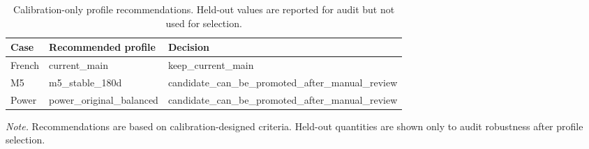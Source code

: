 \begin{table}[t]
\centering
\small
\caption{Calibration-only profile recommendations. Held-out values are reported for audit but not used for selection.}
\label{tab:profile_recommendations}
\begin{tabularx}{\linewidth}{llY}
\toprule
Case & Recommended profile & Decision \\
\midrule
French & current\_main & keep\_current\_main \\
M5 & m5\_stable\_180d & candidate\_can\_be\_promoted\_after\_manual\_review \\
Power & power\_original\_balanced & candidate\_can\_be\_promoted\_after\_manual\_review \\
\bottomrule
\end{tabularx}
\vspace{2pt}
\begin{minipage}{.98\linewidth}
\footnotesize \textit{Note.} Recommendations are based on calibration-designed criteria. Held-out quantities are shown only to audit robustness after profile selection.
\end{minipage}
\end{table}
